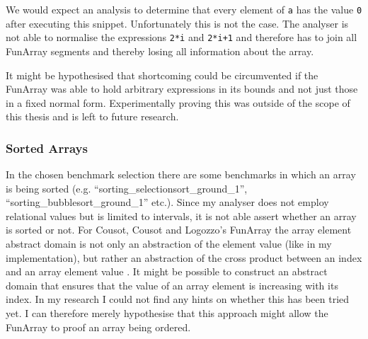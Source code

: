 \noindent We would expect an analysis to determine that every element of \texttt{a} has the value \texttt{0} after executing this snippet. Unfortunately this is not the case. The analyser is not able to normalise the expressions \texttt{2*i} and \texttt{2*i+1} and therefore has to join all FunArray segments and thereby losing all information about the array.
 
It might be hypothesised that shortcoming could be circumvented if the FunArray was able to hold arbitrary expressions in its bounds and not just those in a fixed normal form. Experimentally proving this was outside of the scope of this thesis and is left to future research.
 

\subsubsection{Sorted Arrays}

In the chosen benchmark selection there are some benchmarks in which an array is being sorted (e.g. ``sorting\_selectionsort\_ground\_1'', ``sorting\_bubblesort\_\allowbreak{}ground\_1'' etc.). Since my analyser does not employ relational values but is limited to intervals, it is not able assert whether an array is sorted or not. 
 For Cousot, Cousot and Logozzo's FunArray the array element abstract domain is not only an abstraction of the element value (like in my implementation), but rather an abstraction of the cross product between an index and an array element value \cite{cousot2011}. It might be possible to construct an abstract domain that ensures that the value of an array element is increasing with its index. In my research I could not find any hints on whether this has been tried yet. I can therefore merely hypothesise that this approach might allow the FunArray to proof an array being ordered. 
 
 
 
 
 
 
 
 
 
 
 
 

